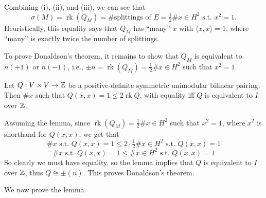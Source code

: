 \documentclass[main]{subfiles}
\begin{document}
Combining (i), (ii), and (iii), we can see that
\[
\sigma(M) = \operatorname{rk}(Q_M) = \#\text{splittings of } E = \tfrac12 \# x\in H^2 \text{ s.t.\ } x^2=1.
\]
Heuristically, this equality says that $Q_M$ has ``many'' $x$ with $\langle x,x\rangle=1$, where ``many'' is exactly twice the number of splittings.

To prove Donaldson's theorem, it remains to show that $Q_M$ is equivalent to $n(+1)$ or $n(-1)$, i.e., $\pm n = \operatorname{rk}(Q_M) = \tfrac12 \# x\in H^2$ such that $x^2=1$.

\begin{lemma}
Let $Q : V\times V \to \mathbb Z$ be a positive-definite symmetric unimodular bilinear pairing. Then $\# x$ such that $Q(x,x)=1 \leq 2\operatorname{rk} Q$, with equality iff $Q$ is equivalent to $I$ over $\mathbb Z$.
\end{lemma}

Assuming the lemma, since $\operatorname{rk}(Q_M) = \tfrac12 \# x\in H^2$ such that $x^2=1$, where $x^2$ is shorthand for $Q(x,x)$, we get that
\[
\#x \text{ s.t.\ } Q(x,x)=1 \leq 2\cdot\tfrac12 \#x\in H^2 \text{ s.t.\ } Q(x,x)=1
\]
\[
\#x \text{ s.t.\ } Q(x,x)=1 \leq \#x\in H^2 \text{ s.t.\ } Q(x,x)=1
\]
So clearly we must have equality, so the lemma implies that $Q$ is equivalent to $I$ over $\mathbb Z$, thus $Q \cong \pm(n)$. This proves Donaldson's theorem.

We now prove the lemma.
\end{document}
